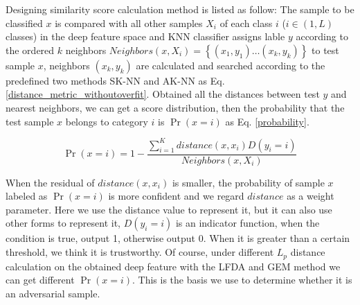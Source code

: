 \documentclass{ieeeaccess}
\begin{document}

Designing similarity score calculation method is listed as follow:
The sample to be classified $x$ is compared with all other samples $X_{i}$ of each class $i$ ($i \in (1,L)$ classes) in the deep feature space and KNN classifier assigns lable $y$ according to the ordered $k$ neighbors $Neighbors(x, X_{i})=\left\{\left(x_{1}, y_{1}\right) \ldots\left(x_{k}, y_{k}\right)\right\}$ to test sample $x$, neighbors $\left(x_{k}, y_{k}\right)$ are calculated and searched according to the predefined two methods SK-NN and AK-NN as Eq.\ref{distance_metric_withoutoverfit}. Obtained all the distances between test $y$ and nearest neighbors, we can get a score distribution, then the probability that the test sample $x$ belongs to category $i$ is $\Pr(x = i)$ as Eq. \ref{probability}. 

\begin{equation}
\Pr(x = i) = 1 - \frac{\sum_{i=1}^{K} distance(x,x_i) D(y_i = i) }{ Neighbors(x,X_i)}
\label{probability}
\end{equation}

When the residual of $distance(x,x_i)$ is smaller, the probability of sample $x$ labeled as $\Pr(x = i)$ is more confident and we regard $distance$ as a weight parameter. Here we use the distance value to represent it, but it can also use other forms to represent it, $D(y_i = i)$ is an indicator function, when the condition is true, output 1, otherwise output 0. When it is greater than a certain threshold, we think it is trustworthy.	
Of course, under different $L_p$ distance calculation on the obtained deep feature with the LFDA and GEM method we can get different $\Pr(x = i)$. This is the basis we use to determine whether it is an adversarial sample.
\end{document}
